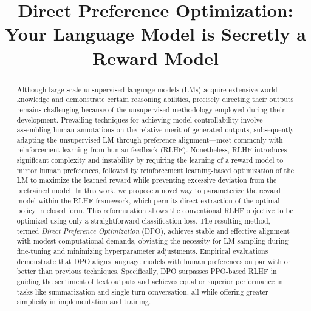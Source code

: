 \title{Direct Preference Optimization: Your Language Model is Secretly a Reward Model}

\begin{abstract}
Although large-scale unsupervised language models (LMs) acquire extensive world knowledge and demonstrate certain reasoning abilities, precisely directing their outputs remains challenging because of the unsupervised methodology employed during their development. Prevailing techniques for achieving model controllability involve assembling human annotations on the relative merit of generated outputs, subsequently adapting the unsupervised LM through preference alignment—most commonly with reinforcement learning from human feedback (RLHF). Nonetheless, RLHF introduces significant complexity and instability by requiring the learning of a reward model to mirror human preferences, followed by reinforcement learning-based optimization of the LM to maximize the learned reward while preventing excessive deviation from the pretrained model. In this work, we propose a novel way to parameterize the reward model within the RLHF framework, which permits direct extraction of the optimal policy in closed form. This reformulation allows the conventional RLHF objective to be optimized using only a straightforward classification loss. The resulting method, termed \textit{Direct Preference Optimization} (DPO), achieves stable and effective alignment with modest computational demands, obviating the necessity for LM sampling during fine-tuning and minimizing hyperparameter adjustments. Empirical evaluations demonstrate that DPO aligns language models with human preferences on par with or better than previous techniques. Specifically, DPO surpasses PPO-based RLHF in guiding the sentiment of text outputs and achieves equal or superior performance in tasks like summarization and single-turn conversation, all while offering greater simplicity in implementation and training.
\end{abstract}

